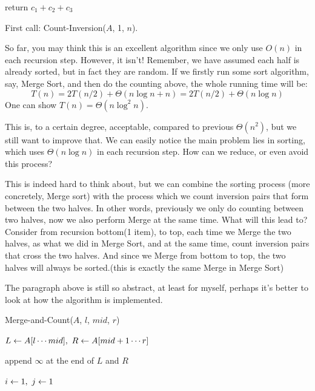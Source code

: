 \begin{spacing}{1.3}
\begin{algorithm}[H]
        return $c_1+c_2+c_3$
    \end{algorithm}

    First call: Count-Inversion($A$, 1, $n$).

    So far, you may think this is an excellent algorithm since we 
    only use $O(n)$ in each recursion step. However, it isn't! 
    Remember, we have assumed each half is already sorted, but in fact 
    they are random. If we firstly run some sort algorithm, say, 
    Merge Sort, and then do the counting above, the whole 
    running time will be:
    $$T(n)=2T(n/2)+\Theta (n\log n+n)=2T(n/2)+\Theta (n\log n)$$
    One can show $T(n)=\Theta(n\log^2 n)$.

    This is, to a certain degree, acceptable, compared to previous $\Theta(n^2)$,
    but we still want to improve that. 
    We can easily notice the main problem lies in sorting, which 
    uses $\Theta(n\log n)$ in each recursion step. How can we 
    reduce, or even avoid this process? 

    This is indeed hard to think about, but we can combine the sorting process 
    (more concretely, Merge sort)
    with the process which we count inversion pairs that form between the 
    two halves. In other words, previously we only do counting between 
    two halves, now we also perform Merge at the same time.
    What will this lead to? Consider from recursion bottom(1 item), 
    to top, each time we Merge the two halves, as what we did in 
    Merge Sort, and at the same time, count inversion pairs that cross 
    the two halves. And since we Merge from bottom to top, 
    the two halves will always be sorted.(this is exactly the same 
    Merge in Merge Sort)

    The paragraph above is still so abstract, at least for myself, 
    perhaps it's better to look at how the algorithm is implemented.\\

    \begin{algorithm}[H]
        \caption{Merge-and-Count($A$, $l$, $mid$, $r$)}


        $L\leftarrow A[l\cdots mid],\ R\leftarrow A[mid+1\cdots r]$

        append $\infty$ at the end of $L$ and $R$

        $i\leftarrow 1,\ j\leftarrow 1$ \qquad {}


\end{algorithm}
\end{spacing}
